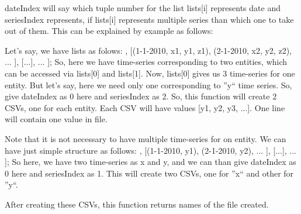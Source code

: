 dateIndex will say which tuple number for the list lists[i] represents date and 
seriesIndex represents, if lists[i] represents multiple series than which one 
to take out of them. This can be explained by example as follows:

Let's say, we have lists as folows: \newline
\newline
[ \newline
\hfill  [(1-1-2010, x1, y1, z1), (2-1-2010, x2, y2, z2), ... ], \newline
\hfill  [(1-1-2010, x1, y1, z1), (2-1-2010, x2, y2, z2), ... ], \newline
\hfill  [...], ...  \newline
]; \newline
 \newline
So, here we have time-series corresponding to two entities, which can be 
accessed via lists[0] and lists[1]. Now, lists[0] gives us 3 time-series for 
one entity. But let's say, here we need only one corresponding to ''y`` time 
series. So, give dateIndex as 0 here and seriesIndex as 2. So, this function 
will create 2 CSVs, one for each entity. Each CSV will have values [y1, y2, y3, 
...]. One line will contain one value in file.

Note that it is not necessary to have multiple time-series for on entity. We 
can have just simple structure as follows: \newline
\newline
[ \newline
\hspace{1cm}  [(1-1-2010, x1), (2-1-2010, x2), ... ], \newline
\hspace{1cm}  [(1-1-2010, y1), (2-1-2010, y2), ... ], \newline
\hspace{1cm}  [...], ...  \newline
]; \newline
 \newline
So here, we have two time-series as x and y, and we can than give dateIndex as 
0 here and seriesIndex as 1. This will create two CSVs, one for ''x`` and other 
for ''y``.

After creating these CSVs, this function returns names of the file created.


